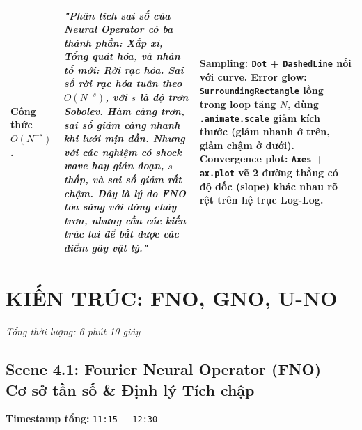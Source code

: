 \begin{tabularx}{\textwidth}{|p{3.6cm}|>{\raggedright\arraybackslash}X|p{4.6cm}|}
Công thức $O(N^{-s})$.
& \textit{"Phân tích sai số của Neural Operator có ba thành phần: Xấp xỉ, Tổng quát hóa, và nhân tố mới: Rời rạc hóa. Sai số rời rạc hóa tuân theo $O(N^{-s})$, với $s$ là độ trơn Sobolev. Hàm càng trơn, sai số giảm càng nhanh khi lưới mịn dần. Nhưng với các nghiệm có shock wave hay gián đoạn, $s$ thấp, và sai số giảm rất chậm. Đây là lý do FNO tỏa sáng với dòng chảy trơn, nhưng cần các kiến trúc lai để bắt được các điểm gãy vật lý."} 
& \textbf{Sampling:} \texttt{Dot} + \texttt{DashedLine} nối với curve. \newline 
\textbf{Error glow:} \texttt{SurroundingRectangle} lồng trong loop tăng $N$, dùng \texttt{.animate.scale} giảm kích thước (giảm nhanh ở trên, giảm chậm ở dưới). \newline 
\textbf{Convergence plot:} \texttt{Axes} + \texttt{ax.plot} vẽ 2 đường thẳng có độ dốc (slope) khác nhau rõ rệt trên hệ trục Log-Log. \\ \hline
\end{tabularx}

\section{KIẾN TRÚC: FNO, GNO, U-NO}
\textit{Tổng thời lượng: 6 phút 10 giây}

\subsection{Scene 4.1: Fourier Neural Operator (FNO) -- Cơ sở tần số \& Định lý Tích chập}
\textbf{Timestamp tổng:} \texttt{11:15 -- 12:30}

